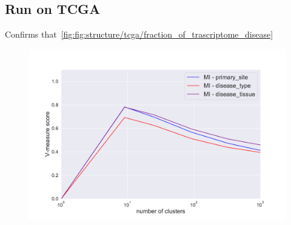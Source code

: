 \subsection{Run on TCGA}
Confirms that~\ref{fig:fig:structure/tcga/fraction_of_trascriptome_disease}

\begin{figure}[htb!]
    \centering
    \includegraphics[width=0.8\linewidth]{pictures/topic/tcga/metric.pdf}
    \caption{}
    \label{fig:topic/tcga/metric}
\end{figure}

